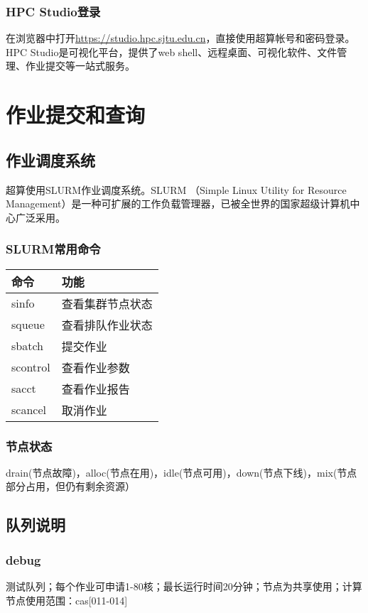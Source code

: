 \documentclass[cn, 12pt, hang, black, chinese]{elegantbook}
\begin{document}
\subsection*{HPC Studio登录}
在浏览器中打开\href{https://studio.hpc.sjtu.edu.cn}{https://studio.hpc.sjtu.edu.cn}，直接使用超算帐号和密码登录。HPC Studio是可视化平台，提供了web shell、远程桌面、可视化软件、文件管理、作业提交等一站式服务。

\chapter{作业提交和查询}

\section{作业调度系统}
超算使用SLURM作业调度系统。SLURM （Simple Linux Utility for Resource Management）是一种可扩展的工作负载管理器，已被全世界的国家超级计算机中心广泛采用。

\subsection*{SLURM常用命令}

\begin{tabular}{ |l|l| }
 \hline
 命令 & 功能 \\
 \hline \hline
 sinfo & 查看集群节点状态 \\
 \hline
 squeue & 查看排队作业状态 \\
 \hline
 sbatch & 提交作业 \\
 \hline
 scontrol & 查看作业参数 \\
 \hline
 sacct & 查看作业报告 \\
 \hline
 scancel & 取消作业 \\
 \hline
\end{tabular}

\subsection*{节点状态}
drain(节点故障)，alloc(节点在用)，idle(节点可用)，down(节点下线)，mix(节点部分占用，但仍有剩余资源）

\section{队列说明}

\subsection*{debug}
测试队列；每个作业可申请1-80核；最长运行时间20分钟；节点为共享使用；计算节点使用范围：cas[011-014]
\end{document}
